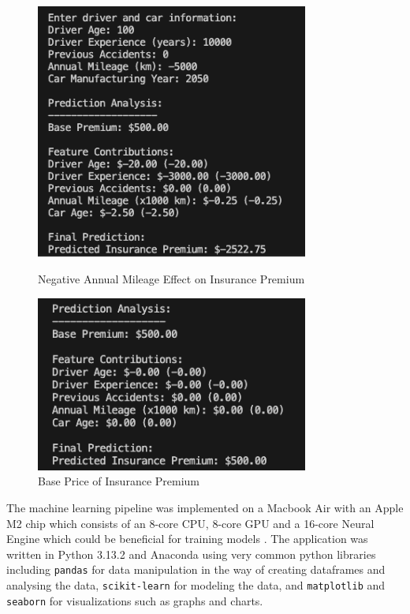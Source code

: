 \documentclass{article}
\begin{document}
\begin{figure}[h]
\centering
    \begin{minipage}{0.45\textwidth}
        \includegraphics[width=0.8\textwidth]{negative_price.png}
        \caption{Negative Annual Mileage Effect on Insurance Premium}\label{fig:negative_mileage}
    \end{minipage}
    \hfill
    \begin{minipage}{0.45\textwidth}
        \includegraphics[width=0.8\textwidth]{base_price.png}
        \caption{Base Price of Insurance Premium}\label{fig:base_price}
    \end{minipage}
\end{figure}

The machine learning pipeline was implemented on a Macbook Air with an Apple M2 chip which consists of an 8-core CPU, 8-core GPU and a 16-core Neural Engine which could be beneficial for training models \cite{appleMacbookAir}. The application was written in Python 3.13.2 and Anaconda using very common python libraries including \texttt{pandas} for data manipulation in the way of creating dataframes and analysing the data, \texttt{scikit-learn} for modeling the data, and \texttt{matplotlib} and \texttt{seaborn} for visualizations such as graphs and charts.
\end{document}
